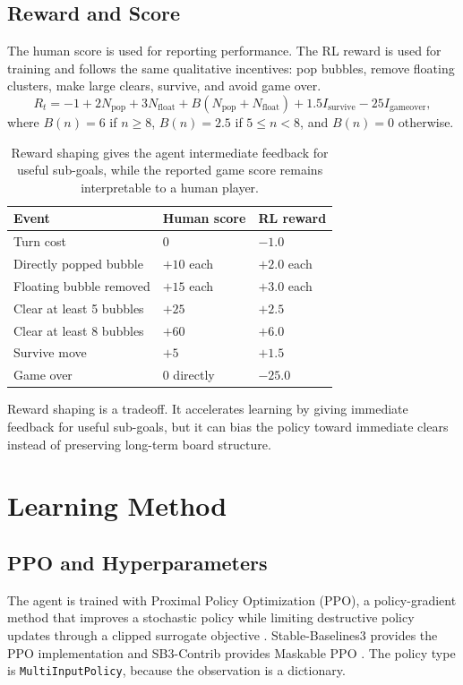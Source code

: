 \documentclass[10pt,a4paper]{article}
\begin{document}
\subsection{Reward and Score}

The human score is used for reporting performance. The RL reward is used for training and follows the same qualitative incentives: pop bubbles, remove floating clusters, make large clears, survive, and avoid game over.
\[
R_t =
-1
+2N_{\mathrm{pop}}
+3N_{\mathrm{float}}
+B(N_{\mathrm{pop}}+N_{\mathrm{float}})
+1.5I_{\mathrm{survive}}
-25I_{\mathrm{gameover}},
\]
where \(B(n)=6\) if \(n\geq8\), \(B(n)=2.5\) if \(5\leq n<8\), and \(B(n)=0\) otherwise.

\begin{table}[H]
\centering
\caption{Reward shaping gives the agent intermediate feedback for useful sub-goals, while the reported game score remains interpretable to a human player.}
\label{tab:reward}
\small
\begin{tabular}{lll}
\toprule
Event & Human score & RL reward \\
\midrule
Turn cost & 0 & \(-1.0\) \\
Directly popped bubble & \(+10\) each & \(+2.0\) each \\
Floating bubble removed & \(+15\) each & \(+3.0\) each \\
Clear at least 5 bubbles & \(+25\) & \(+2.5\) \\
Clear at least 8 bubbles & \(+60\) & \(+6.0\) \\
Survive move & \(+5\) & \(+1.5\) \\
Game over & 0 directly & \(-25.0\) \\
\bottomrule
\end{tabular}
\end{table}

Reward shaping is a tradeoff. It accelerates learning by giving immediate feedback for useful sub-goals, but it can bias the policy toward immediate clears instead of preserving long-term board structure.

\section{Learning Method}

\subsection{PPO and Hyperparameters}

The agent is trained with Proximal Policy Optimization (PPO), a policy-gradient method that improves a stochastic policy while limiting destructive policy updates through a clipped surrogate objective \cite{Schulman2017}. Stable-Baselines3 provides the PPO implementation and SB3-Contrib provides Maskable PPO \cite{SB3PPO,SB3MaskablePPO}. The policy type is \texttt{MultiInputPolicy}, because the observation is a dictionary.
\end{document}

